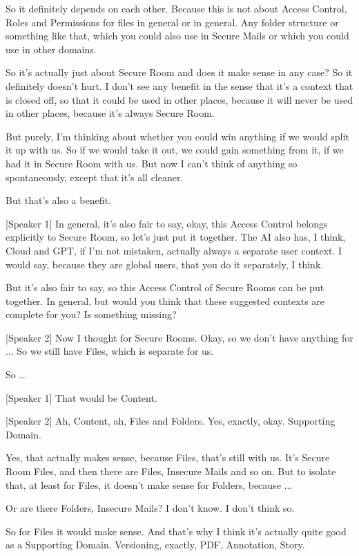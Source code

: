 So it definitely depends on each other. Because this is not about Access Control, Roles and Permissions for files in general or in general. Any folder structure or something like that, which you could also use in Secure Mails or which you could use in other domains.

So it's actually just about Secure Room and does it make sense in any case? So it definitely doesn't hurt. I don't see any benefit in the sense that it's a context that is closed off, so that it could be used in other places, because it will never be used in other places, because it's always Secure Room.

But purely, I'm thinking about whether you could win anything if we would split it up with us. So if we would take it out, we could gain something from it, if we had it in Secure Room with us. But now I can't think of anything so spontaneously, except that it's all cleaner.

But that's also a benefit.

[Speaker 1]
In general, it's also fair to say, okay, this Access Control belongs explicitly to Secure Room, so let's just put it together. The AI also has, I think, Cloud and GPT, if I'm not mistaken, actually always a separate user context. I would say, because they are global users, that you do it separately, I think.

But it's also fair to say, so this Access Control of Secure Rooms can be put together. In general, but would you think that these suggested contexts are complete for you? Is something missing?

[Speaker 2]
Now I thought for Secure Rooms. Okay, so we don't have anything for ... So we still have Files, which is separate for us.

So ...

[Speaker 1]
That would be Content.

[Speaker 2]
Ah, Content, ah, Files and Folders. Yes, exactly, okay. Supporting Domain.

Yes, that actually makes sense, because Files, that's still with us. It's Secure Room Files, and then there are Files, Insecure Mails and so on. But to isolate that, at least for Files, it doesn't make sense for Folders, because ...

Or are there Folders, Insecure Mails? I don't know. I don't think so.

So for Files it would make sense. And that's why I think it's actually quite good as a Supporting Domain. Versioning, exactly, PDF, Annotation, Story.

